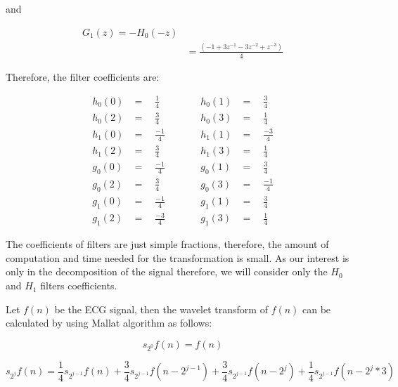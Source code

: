and

\begin{equation} \label{eq1}
\begin{split}
G_1(z) = -H_0(-z) \\
& = \frac{(-1 + 3z^{-1} - 3z^{-2} + z^{-3})}{4}
\end{split}
\end{equation}

Therefore, the filter coefficients are:

\begin{equation}
\label{eqn:filters}
\begin{aligned}
h_0(0) & =  \quad \frac{1}{4}    & \quad &\quad  h_0(1) &= \quad \frac{3}{4} \\
h_0(2) & =  \quad \frac{3}{4}    & \quad &\quad   h_0(3) &= \quad \frac{1}{4} \\[1ex]
h_1(0) & =  \quad \frac{- 1}{4}  & \quad &\quad   h_1(1) &= \quad \frac{-3}{4} \\
h_1(2) & =  \quad \frac{3}{4}    & \quad &\quad   h_1(3) &= \quad \frac{1}{4} \\[1ex]
g_0(0) & =  \quad \frac{-1}{4}   & \quad &\quad   g_0(1) &= \quad \frac{3}{4} \\
g_0(2) & =  \quad \frac{3}{4}    & \quad &\quad   g_0(3) &= \quad \frac{-1}{4} \\[1ex]
g_1(0) & =  \quad \frac{-1}{4}   & \quad &\quad   g_1(1) &= \quad \frac{3}{4} \\
g_1(2) & =  \quad \frac{-3}{4}   & \quad &\quad   g_1(3) &= \quad \frac{1}{4}
\end{aligned}
\end{equation}

The coefficients of filters are just simple fractions, therefore, the amount of computation and time needed for the transformation is small. As our interest is only in the decomposition of the signal therefore, we will consider only the $H_0$ and $H_1$ filters coefficients.

Let $f(n)$ be the ECG signal, then the wavelet transform of $f(n)$ can be calculated by using Mallat algorithm as follows:

\begin{equation} 
{ s_{2^0}f(n) = f(n)   }
\end{equation}

\begin{equation} \label{eqn:approx}
{ s_{2^j}f(n) = \frac{1}{4}s_{2^{j-1}}f(n) + \frac{3}{4}s_{2^{j-1}}f(n-2^{j-1}) + \frac{3}{4}s_{2^{j-1}}f(n-2^{j}) + \frac{1}{4}s_{2^{j-1}}f(n-2^{j} * 3) }
\end{equation}

